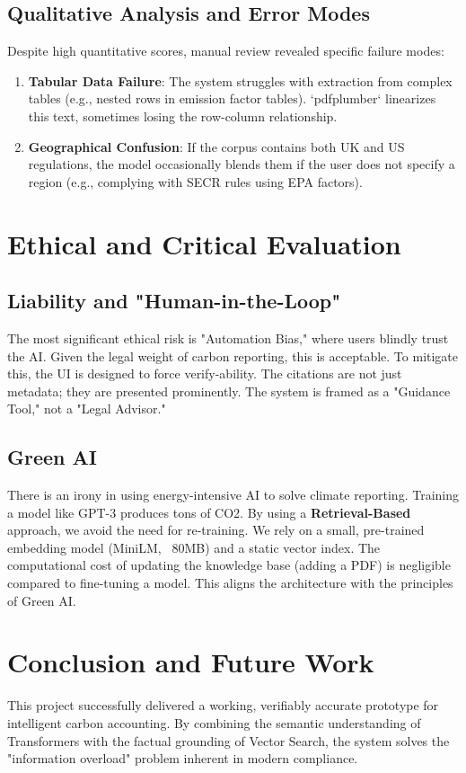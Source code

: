 \documentclass[12pt, a4paper]{article}
\begin{document}
\subsection{Qualitative Analysis and Error Modes}
Despite high quantitative scores, manual review revealed specific failure modes:
\begin{enumerate}
    \item \textbf{Tabular Data Failure}: The system struggles with extraction from complex tables (e.g., nested rows in emission factor tables). `pdfplumber` linearizes this text, sometimes losing the row-column relationship.
    \item \textbf{Geographical Confusion}: If the corpus contains both UK and US regulations, the model occasionally blends them if the user does not specify a region (e.g., complying with SECR rules using EPA factors).
\end{enumerate}

\section{Ethical and Critical Evaluation}
\subsection{Liability and "Human-in-the-Loop"}
The most significant ethical risk is "Automation Bias," where users blindly trust the AI. Given the legal weight of carbon reporting, this is acceptable. To mitigate this, the UI is designed to force verify-ability. The citations are not just metadata; they are presented prominently. The system is framed as a "Guidance Tool," not a "Legal Advisor."

\subsection{Green AI}
There is an irony in using energy-intensive AI to solve climate reporting. Training a model like GPT-3 produces tons of CO2. By using a \textbf{Retrieval-Based} approach, we avoid the need for re-training. We rely on a small, pre-trained embedding model (MiniLM, ~80MB) and a static vector index. The computational cost of updating the knowledge base (adding a PDF) is negligible compared to fine-tuning a model. This aligns the architecture with the principles of Green AI.

\section{Conclusion and Future Work}
This project successfully delivered a working, verifiably accurate prototype for intelligent carbon accounting. By combining the semantic understanding of Transformers with the factual grounding of Vector Search, the system solves the "information overload" problem inherent in modern compliance.
\end{document}
